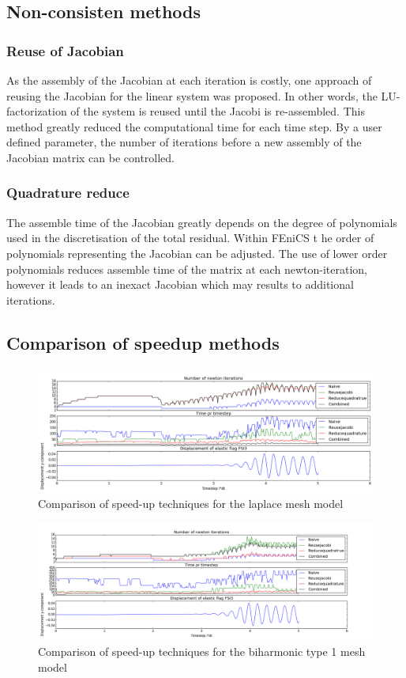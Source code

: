 \subsection{Non-consisten methods}    
\subsubsection{Reuse of Jacobian}
As the assembly of the Jacobian at each iteration is costly, one approach of reusing the Jacobian for the linear system was proposed. In other words, the LU-factorization of the system is reused until the Jacobi is re-assembled. This method greatly reduced the computational time for each time step. By a user defined parameter, the number of iterations before a new assembly of the Jacobian matrix can be controlled. 

\subsubsection{Quadrature reduce}
The assemble time of the Jacobian greatly depends on the degree of polynomials used in the discretisation of the total residual. Within FEniCS t he order of polynomials representing the Jacobian can be adjusted. The use of lower order polynomials reduces assemble time of the matrix at each newton-iteration, however it leads to an inexact Jacobian which may results to additional iterations. 


\subsection{Comparison of speedup methods}


\begin{figure}[h!]
 \includegraphics[scale=0.36]{./Fig/itercompare.png}
 \caption{Comparison of speed-up techniques for the laplace mesh model}
\end{figure}

\begin{figure}[h!]
 \includegraphics[scale=0.4]{./Fig/bi_compareit.png}
 \caption{Comparison of speed-up techniques for the biharmonic type 1 mesh model}
\end{figure}


